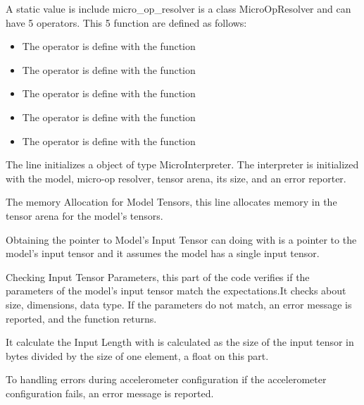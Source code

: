 A static value is include micro\_op\_resolver is a class MicroOpResolver  and can have 5 operators. This 5 function are defined as follows: 

\begin{itemize}
    \item The operator   is define with the function 
    \item  The operator   is define with the function 
    \item The operator   is define with the function 
    \item The operator   is define with the function 
    \item The operator   is define with the function 
\end{itemize} 

\begin{center}
    \label{Magic Wand function}
\end{center}

The line initializes a object   of type MicroInterpreter. The interpreter is initialized with the model, micro-op resolver, tensor arena, its size, and an error reporter.

The memory Allocation for Model Tensors, this line allocates memory in the tensor arena for the model's tensors. 

Obtaining the pointer to Model's Input Tensor can doing with  is a pointer to the model's input tensor and it assumes the model has a single input tensor.

Checking Input Tensor Parameters, this part of the code verifies if the parameters of the model's input tensor match the expectations.It checks about size, dimensions, data type. If the parameters do not match, an error message is reported, and the function returns.

It calculate the Input Length with  is calculated as the size of the input tensor in bytes divided by the size of one element, a float on this part.

To handling errors during accelerometer configuration if the accelerometer configuration fails, an error message is reported.

